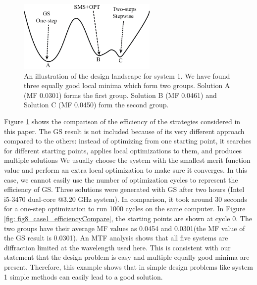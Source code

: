 \begin{figure}[h!]
    \centering
    \includegraphics[width=0.6\textwidth]{chapter-5/figures/Fig7_Landscape_illustration_sys1-2.png}
    \caption{An illustration of the design landscape for system 1. We have found three equally good local minima which form two groups. Solution A (MF 0.0301) forms the first group. Solution B (MF 0.0461) and Solution C (MF 0.0450) form the second group.}
    \label{fig: fig7_landscape_illus}
\end{figure}


Figure \ref{fig: fig7_landscape_illus} shows the comparison of the efficiency of the strategies considered in this paper. The GS result is not included because of its very different approach compared to the others: instead of optimizing from one starting point, it searches for different starting points, applies local optimizations to them, and produces multiple solutions \cite{codevmanual} We usually choose the system with the smallest merit function value and perform an extra local optimization to make sure it converges. In this case, we cannot easily use the number of optimization cycles to represent the efficiency of GS. Three solutions were generated with GS after two hours (Intel i5-3470 dual-core @3.20 GHz system). In comparison, it took around 30 seconds for a one-step optimization to run 1000 cycles on the same computer. In Figure \ref{fig: fig8_case1_efficiencyCompare}, the starting points are shown at cycle 0. The two groups have their average MF values as 0.0454 and 0.0301(the MF value of the GS result is 0.0301). An MTF analysis shows that all five systems are diffraction limited at the wavelength used here. This is consistent with our statement that the design problem is easy and multiple equally good minima are present. Therefore, this example shows that in simple design problems like system 1 simple methods can easily lead to a good solution. 

